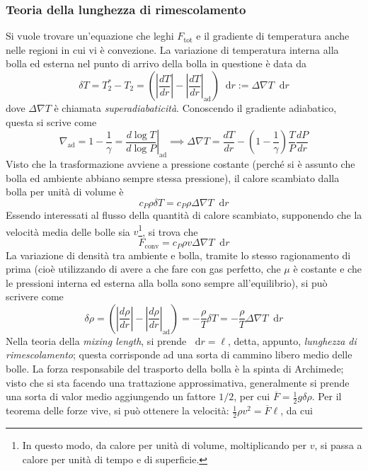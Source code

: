 \documentclass[11pt, a4paper]{scrartcl}
\theoremstyle{style}
\theoremstyle{style1}
\newcommand{\dd}{\mathop{}\!\mathrm{d}}
\newcommand*\Eval[3]{\left.#1\right\rvert_{#2}^{#3}}
\numberwithin{equation}{subsection}
\begin{document}
\subsubsection{Teoria della lunghezza di rimescolamento}
Si vuole trovare un'equazione che leghi $F_\text{tot}$ e il gradiente di temperatura anche nelle regioni in cui vi \`e convezione.
La variazione di temperatura interna alla bolla ed esterna nel punto di arrivo della bolla in questione \`e data da 
\[
\delta T = T_2^* - T_2 = \left(\left\lvert \frac{d T}{d r}  \right\rvert - \left\lvert \frac{d T}{d r}  \right\rvert _\text{ad}\right) \dd r:= \Delta \nabla T \dd r
\] 
dove $\Delta \nabla T$ \`e chiamata \textit{superadiabaticit\`a}.
Conoscendo il gradiente adiabatico, questa si scrive come
\[
	\nabla _\text{ad} = 1 - \frac{1}{\gamma} = \Eval{\frac{d \log T}{d  \log P } }{\text{ad}}{} \implies \Delta \nabla T = \frac{d T}{d r}  - \left(1- \frac{1}{\gamma}\right) \frac{T}{P} \frac{d P}{d r} 
\] 
Visto che la trasformazione avviene a pressione costante (perch\'e si \`e assunto che bolla ed ambiente abbiano sempre stessa pressione), il calore scambiato dalla bolla per unit\`a di volume \`e
\[
c_P \rho  \delta T = c_P \rho  \Delta \nabla T \dd r
\] 
Essendo interessati al flusso della quantit\`a di calore scambiato, supponendo che la velocit\`a media delle bolle sia $v$\footnote{In questo modo, da calore per unit\`a di volume, moltiplicando per $v$, si passa a calore per unit\`a di tempo e di superficie.}, si trova che
\[
F_\text{conv} = c_P \rho  v \Delta \nabla T \dd r
\] 
La variazione di densit\`a tra ambiente e bolla, tramite lo stesso ragionamento di prima (cio\`e utilizzando di avere a che fare con gas perfetto, che $\mu $ \`e costante e che le pressioni interna ed esterna alla bolla sono sempre all'equilibrio), si pu\`o scrivere come
\[
\delta \rho  = \left(\left\lvert \frac{d \rho }{d r}  \right\rvert - \left\lvert \frac{d \rho }{d r}  \right\rvert _\text{ad}\right) = - \frac{\rho }{T} \delta T = - \frac{\rho }{T}\Delta \nabla T \dd r
\] 
Nella teoria della \textit{mixing length}, si prende $\dd r= \ell $, detta, appunto, \textit{lunghezza di rimescolamento}; questa corrisponde ad una sorta di cammino libero medio delle bolle.
La forza responsabile del trasporto della bolla \`e la spinta di Archimede; visto che si sta facendo una trattazione approssimativa, generalmente si prende una sorta di valor medio aggiungendo un fattore $1 / 2$, per cui $\overline{F} = \frac{1}{2} g \delta \rho $. 
Per il teorema delle forze vive, si pu\`o ottenere la velocit\`a: $\frac{1}{2}\rho  v^2 = \overline{F}\ell $, da cui 
\end{document}

